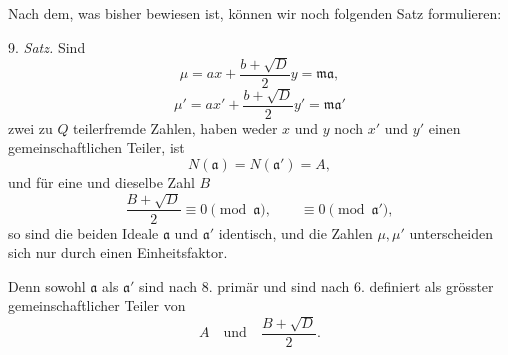 \documentclass[11pt]{article}
\begin{document}
Nach dem, was bisher bewiesen ist, können wir noch folgenden Satz formulieren:

9. \emph{Satz.} Sind
\[
 \mu=ax+\frac{b+\sqrt D}{2}y=\mathfrak m\mathfrak a,
\]
\[
 \mu'=ax'+\frac{b+\sqrt D}{2}y'=\mathfrak m\mathfrak a'
\]
zwei zu $Q$ teilerfremde Zahlen, haben weder $x$ und $y$ noch $x'$ und $y'$ einen gemeinschaftlichen Teiler, ist
\[
 N(\mathfrak a)=N(\mathfrak a')=A,
\]
und für eine und dieselbe Zahl $B$
\[
 \frac{B+\sqrt D}{2}\equiv0\pmod{\mathfrak a},
 \qquad
 \equiv0\pmod{\mathfrak a'},
\]
so sind die beiden Ideale $\mathfrak a$ und $\mathfrak a'$ identisch, und die Zahlen $\mu,\mu'$ unterscheiden sich nur durch einen Einheitsfaktor.

Denn sowohl $\mathfrak a$ als $\mathfrak a'$ sind nach 8. primär und sind nach 6. definiert als grösster gemeinschaftlicher Teiler von
\[
 A\quad\text{und}\quad \frac{B+\sqrt D}{2}.
\]
\end{document}

